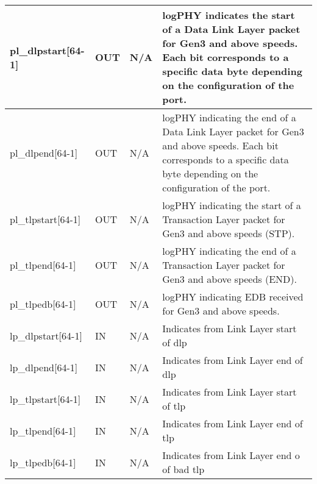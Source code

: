 \begin{table}[H]

    \centering
  \begin{tabular}{ |m{26mm}|P{10mm}|P{18mm}|m{60mm}|  }
  \hline

pl\_dlpstart[64-1] & OUT &N/A & logPHY indicates the start of a Data Link Layer packet for Gen3 and above speeds. Each
bit corresponds to a specific data byte depending on the configuration of the port.\\ \hline 
pl\_dlpend[64-1]& OUT &N/A & logPHY indicating the end of a Data Link Layer packet for Gen3 and above speeds. Each
bit corresponds to a specific data byte depending on the configuration of the port.\\ \hline
pl\_tlpstart[64-1]& OUT &N/A &logPHY indicating the start of a Transaction Layer packet for Gen3 and above speeds
(STP). \\ \hline
pl\_tlpend[64-1]& OUT &N/A & logPHY indicating the end of a Transaction Layer packet for Gen3 and above speeds
(END).\\ \hline
pl\_tlpedb[64-1]& OUT &N/A & logPHY indicating EDB received for Gen3 and above speeds. \\ \hline

lp\_dlpstart[64-1] & IN &N/A & 
Indicates from Link Layer start of dlp\\ \hline 
lp\_dlpend[64-1]& IN &N/A & 
Indicates from Link Layer end of dlp\\ \hline
lp\_tlpstart[64-1]& IN &N/A &
Indicates from Link Layer start of tlp \\ \hline
lp\_tlpend[64-1]& IN &N/A & 
Indicates from Link Layer end of tlp\\ \hline
lp\_tlpedb[64-1]& IN &N/A & 
Indicates from Link Layer end o of bad tlp\\ \hline

\end{tabular}
\end{table}


